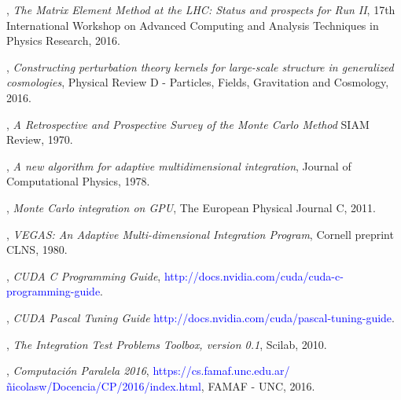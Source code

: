 \documentclass[english]{maciarticle}
\begin{document}
\begin{thebibliography}{1}
 {},
\emph{The Matrix Element Method at the LHC: Status and prospects for Run II},
17th International Workshop on Advanced Computing and Analysis Techniques in Physics Research, 2016.

 {},
\emph{Constructing perturbation theory kernels for large-scale structure in generalized cosmologies},
Physical Review D - Particles, Fields, Gravitation and Cosmology, 2016.

 {},
\emph{A Retrospective and Prospective Survey of the Monte Carlo Method}
SIAM Review, 1970.

 {},
\emph{A new algorithm for adaptive multidimensional integration},
Journal of Computational Physics, 1978.

 {},
{\em Monte Carlo integration on GPU},
The European Physical Journal C, 2011.

 {},
{\em VEGAS: An Adaptive Multi-dimensional Integration Program},
Cornell preprint CLNS, 1980.

 {}, {\em CUDA C Programming Guide},
\textcolor{blue}{http://docs.nvidia.com/cuda/cuda-c-programming-guide}.

 {}, {\em CUDA Pascal Tuning Guide} \textcolor{blue}{http://docs.nvidia.com/cuda/pascal-tuning-guide}.

 {},
\emph{The Integration Test Problems Toolbox, version 0.1},
Scilab, 2010.

 {},
{\em Computaci\'on Paralela 2016}, \textcolor{blue}{https://cs.famaf.unc.edu.ar/\~nicolasw/Docencia/CP/2016/index.html},
FAMAF - UNC, 2016.
\end{thebibliography}
\end{document}
